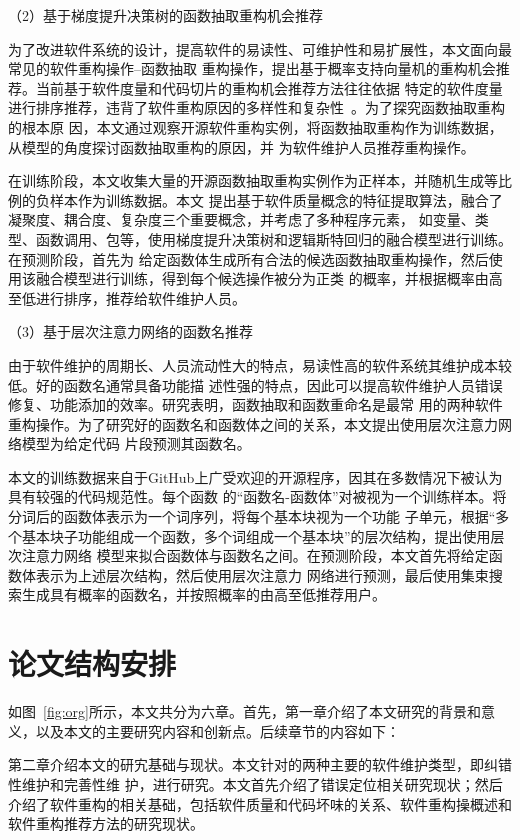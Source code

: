 （2）基于梯度提升决策树的函数抽取重构机会推荐

为了改进软件系统的设计，提高软件的易读性、可维护性和易扩展性，本文面向最常见的软件重构操作--函数抽取
重构操作，提出基于概率支持向量机的重构机会推荐。当前基于软件度量和代码切片的重构机会推荐方法往往依据
特定的软件度量进行排序推荐，违背了软件重构原因的多样性和复杂性~\cite{}。为了探究函数抽取重构的根本原
因，本文通过观察开源软件重构实例，将函数抽取重构作为训练数据，从模型的角度探讨函数抽取重构的原因，并
为软件维护人员推荐重构操作。

在训练阶段，本文收集大量的开源函数抽取重构实例作为正样本，并随机生成等比例的负样本作为训练数据。本文
提出基于软件质量概念的特征提取算法，融合了凝聚度、耦合度、复杂度三个重要概念，并考虑了多种程序元素，
如变量、类型、函数调用、包等，使用梯度提升决策树和逻辑斯特回归的融合模型进行训练。在预测阶段，首先为
给定函数体生成所有合法的候选函数抽取重构操作，然后使用该融合模型进行训练，得到每个候选操作被分为正类
的概率，并根据概率由高至低进行排序，推荐给软件维护人员。

（3）基于层次注意力网络的函数名推荐

由于软件维护的周期长、人员流动性大的特点，易读性高的软件系统其维护成本较低。好的函数名通常具备功能描
述性强的特点，因此可以提高软件维护人员错误修复、功能添加的效率。研究表明，函数抽取和函数重命名是最常
用的两种软件重构操作。为了研究好的函数名和函数体之间的关系，本文提出使用层次注意力网络模型为给定代码
片段预测其函数名。

本文的训练数据来自于GitHub上广受欢迎的开源程序，因其在多数情况下被认为具有较强的代码规范性。每个函数
的``函数名-函数体''对被视为一个训练样本。将分词后的函数体表示为一个词序列，将每个基本块视为一个功能
子单元，根据``多个基本块子功能组成一个函数，多个词组成一个基本块''的层次结构，提出使用层次注意力网络
模型来拟合函数体与函数名之间。在预测阶段，本文首先将给定函数体表示为上述层次结构，然后使用层次注意力
网络进行预测，最后使用集束搜索生成具有概率的函数名，并按照概率的由高至低推荐用户。

\section{论文结构安排}
如图~\ref{fig:org}所示，本文共分为六章。首先，第一章介绍了本文研究的背景和意义，以及本文的主要研究内容和创新点。后续章节的内容如下：  

第二章介绍本文的研宄基础与现状。本文针对的两种主要的软件维护类型，即纠错性维护和完善性维
护，进行研究。本文首先介绍了错误定位相关研究现状；然后介绍了软件重构的相关基础，包括软件质量和代码坏味的关系、软件重构操概述和软件重构推荐方法的研究现状。

